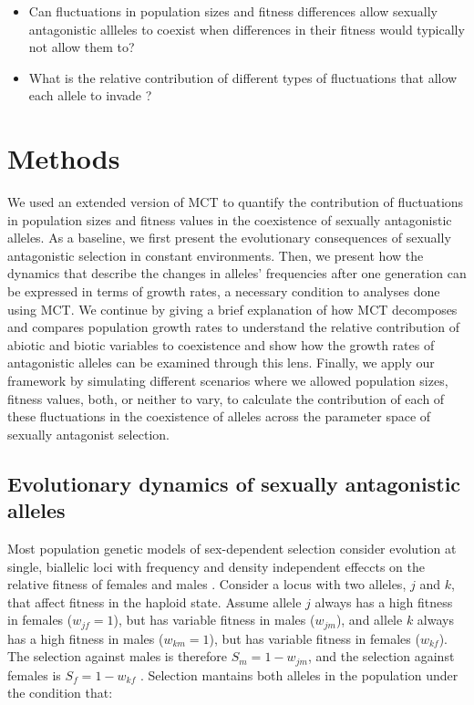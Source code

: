 \documentclass[]{article}
\begin{document}
\begin{itemize}
	\item Can fluctuations in population sizes and fitness differences allow sexually antagonistic allleles to coexist when differences in their fitness would typically not allow them to?
	\item What is the relative contribution of different types of fluctuations that allow each allele to invade ?
\end{itemize}

\clearpage
\section{Methods}

We used an extended version of MCT to quantify the contribution of fluctuations in population sizes and fitness values in the coexistence of sexually antagonistic alleles. As a baseline, we first present the evolutionary consequences of sexually antagonistic selection in constant environments. Then, we present how the dynamics that describe the changes in alleles' frequencies after one generation can be expressed in terms of growth rates, a necessary condition to analyses done using MCT. We continue by giving a brief explanation of how MCT decomposes and compares population growth rates to understand the relative contribution of abiotic and biotic variables to coexistence and show how the growth rates of antagonistic alleles can be examined through this lens. Finally, we apply our framework by simulating different scenarios where we allowed population sizes, fitness values, both, or neither to vary, to calculate the contribution of each of these fluctuations in the coexistence of alleles across the parameter space of sexually antagonist selection.


\subsection*{Evolutionary dynamics of sexually antagonistic alleles}

 Most population genetic models of sex-dependent selection consider evolution at single, biallelic  loci with frequency and density independent effeccts on the relative fitness of females and males \citep{wright1942statistical,kidwell1977regions, immler2012ploidally}. Consider a locus with two alleles, $j$ and $k$, that affect fitness in the haploid state.  Assume allele $j$ always has a high fitness in females ($w_{jf} = 1$), but has variable fitness in males ($w_{jm}$), and allele $k$ always has a high fitness in males ($w_{km} = 1$), but has variable fitness in females ($w_{kf}$). The selection against males is therefore $S_{m}= 1 - w_{jm}$, and the selection against females is $S_{f}= 1 - w_{kf}$ . Selection mantains both alleles in the population under the condition that:
\end{document}
